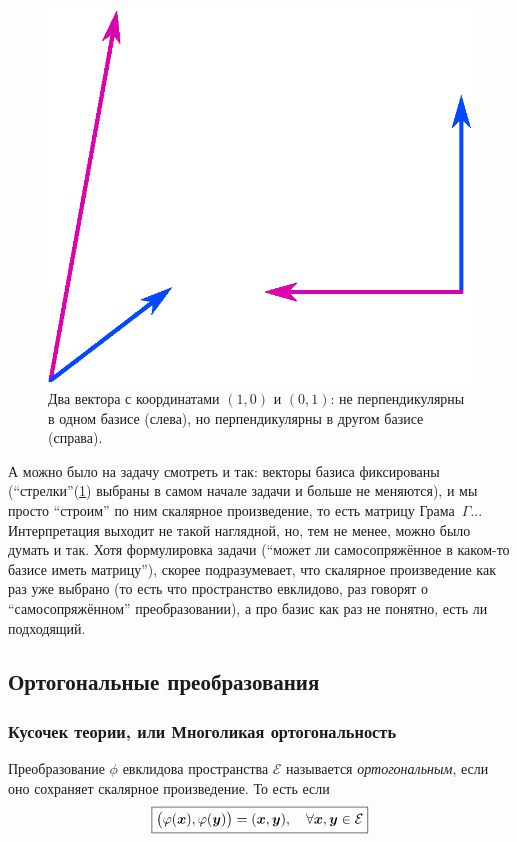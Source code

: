 \documentclass[a4paper,12pt]{article}
\theoremstyle{remark}
\begin{document}
\begin{solution}
\begin{figure}
      \includegraphics[width=0.4\columnwidth]{perp-not-perp}
      
      \caption{Два вектора с координатами $(1, 0)$ и $(0, 1)$: не перпендикулярны в одном базисе (слева), но перпендикулярны в другом базисе (справа).}
      \label{fig:perp-not-perp}
    \end{figure}
    
    А можно было на задачу смотреть и так: векторы базиса фиксированы (``стрелки''(\ref{fig:perp-not-perp}) выбраны в самом начале задачи и больше не меняются), и мы просто ``строим'' по ним скалярное произведение, то есть матрицу Грама~$\Gamma$...
    Интерпретация выходит не такой наглядной, но, тем не менее, можно было думать и так.
    Хотя формулировка задачи (``может ли самосопряжённое в каком-то базисе иметь матрицу''), скорее подразумевает, что скалярное произведение как раз уже выбрано (то есть что пространство евклидово, раз говорят о ``самосопряжённом'' преобразовании), а про базис как раз не понятно, есть ли подходящий.
  \end{solution}
  
  
  

  \subsection{Ортогональные преобразования}
  
  \subsubsection{Кусочек теории, или Многоликая ортогональность}
  
  Преобразование $\phi$ евклидова пространства $\mathcal E$ называется \emph{ортогональным}, если оно сохраняет скалярное произведение.
  То есть если
  \begin{equation}\label{eq:orthogo}
    \boxed{\bigl(\varphi(\boldsymbol x), \varphi(\boldsymbol y)\bigr) = (\boldsymbol x, \boldsymbol y),\quad \forall \boldsymbol x, \boldsymbol y \in \mathcal E}
  \end{equation}
  
\end{document}
